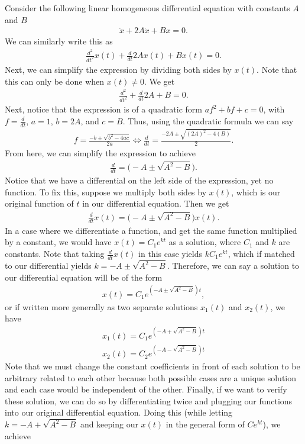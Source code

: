 Consider the following linear homogeneous differential equation with constants $A$ and $B$
\begin{align}
\ddot{x}+2A\dot{x}+Bx=0.
\end{align}
We can similarly write this as
\begin{align}
\frac{d^2}{dt^2}x(t)+\frac{d}{dt}2Ax(t)+Bx(t)=0.
\end{align}
Next, we can simplify the expression by dividing both sides by $x(t)$. Note that this can only be done when $x(t)\neq 0$. We get
\begin{align}
\frac{d^2}{dt^2}+\frac{d}{dt}2A+B=0.
\end{align}
Next, notice that the expression is of a quadratic form $af^2+bf+c=0$, with $f=\frac{d}{dt}$, $a=1$, $b=2A$, and $c=B$. Thus, using the quadratic formula we can say
\begin{align}
f=\frac{-b\pm\sqrt{b^2-4ac}}{2a}\Longleftrightarrow \frac{d}{dt}=\frac{-2A\pm\sqrt{(2A)^2-4(B)}}{2}.
\end{align}
From here, we can simplify the expression to achieve
\begin{align}
\frac{d}{dt}=\big(-A\pm\sqrt{A^2-B}\big).
\end{align}
Notice that we have a differential on the left side of the expression, yet no function. To fix this, suppose we multiply both sides by $x(t)$, which is our original function of $t$ in our differential equation. Then we get
\begin{align}
\frac{d}{dt}x(t)=\big(-A\pm\sqrt{A^2-B}\big)x(t).
\end{align}
In a case where we differentiate a function, and get the same function multiplied by a constant, we would have $x(t)=C_1e^{kt}$ as a solution, where $C_1$ and $k$ are constants. Note that taking $\frac{d}{dt}x(t)$ in this case yields $kC_1e^{kt}$, which if matched to our differential yields $k=-A\pm\sqrt{A^2-B}$. Therefore, we can say a solution to our differential equation will be of the form
\begin{align}
x(t)=C_1e^{(-A\pm\sqrt{A^2-B})t},
\end{align}
or if written more generally as two separate solutions $x_1(t)$ and $x_2(t)$, we have
\begin{align}
x_1(t)=C_1e^{(-A+\sqrt{A^2-B})t} \\
x_2(t)=C_2e^{(-A-\sqrt{A^2-B})t}
\end{align}
Note that we must change the constant coefficients in front of each solution to be arbitrary related to each other because both possible cases are a unique solution and each case would be independent of the other. Finally, if we want to verify these solution, we can do so by differentiating twice and plugging our functions into our original differential equation. Doing this (while letting $k=-A+\sqrt{A^2-B}$ and keeping our $x(t)$ in the general form of $Ce^{kt}$), we achieve
